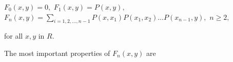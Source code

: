 $F_0(x,y) = 0,$ $F_1(x,y) = P(x,y),$
$F_n(x,y) = \sum_{i=1,2,\ldots,n-1} P(x,x_1)P(x_1,x_2)\ldots P(x_{n-1},y),$ $n \geq 2,$

for all $x,y$ in $R$.

The most important properties of $F_n(x,y)$ are